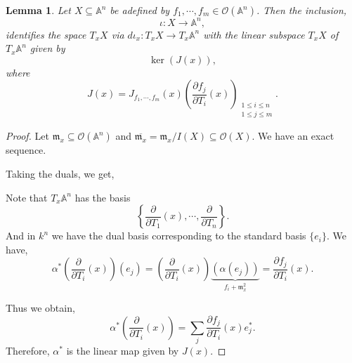 \documentclass[10pt]{article}
\newtheorem{lemma}{Lemma}[section]
\numberwithin{equation}{theorem}
\DeclareMathOperator{\Ker}{ker}
\newcommand{\m}[0]{\mathfrak{m}}
\newcommand{\Ouv}[0]{\mathcal{O}}
\newcommand{\A}[0]{\mathbb{A}}
\begin{document}
\begin{lemma}
  \label{lemma_5_6}
  Let $X\subseteq \A^n$ be adefined by $f_1,\cdots,f_m\in\Ouv(\A^n)$. Then the inclusion, 
  \begin{equation*}
    \iota:X\to \A^n,
  \end{equation*}
  identifies the space $T_xX$ via $d\iota_x:T_xX\to T_x\A^n$ with the linear subspace $T_xX$ of $T_x\A^n$ given by 
  \begin{equation*}
    \Ker(J(x)),
  \end{equation*}
  where 
  \begin{equation*}
    J(x) = J_{f_1,\cdots,f_m}(x)\left({\frac {\partial f_j}{\partial T_i}}(x)\right)_{\substack{1\leq i\leq n\\ 1\leq j\leq m}}.
  \end{equation*}
\end{lemma}
\begin{proof}
Let $\m_x\subseteq\Ouv(\A^n)$ and $\overline{\m_x} = \m_x/I(X)\subseteq\Ouv(X)$. We have an exact sequence.
\begin{center}
\end{center} 
Taking the duals, we get,
\begin{center}
\end{center}
Note that $T_x\A^n$ has the basis 
\begin{equation*}
  \left\{{\frac {\partial }{\partial T_1}}(x),\cdots,\frac {\partial }{\partial T_n}\right\}.
\end{equation*}
And in $k^n$ we have the dual basis corresponding to the standard basis $\{e_i\}$.
We have,
\begin{equation*}
  \alpha^*\left({\frac {\partial}{\partial T_i}}(x)\right)(e_j) = \left({\frac{\partial}{\partial T_i}}(x)\right)\underbrace{(\alpha(e_j))}_{f_i+\m_x^2} = {\frac {\partial f_j} {\partial T_i}}(x).
\end{equation*}

Thus we obtain,
\begin{equation*}
  \alpha^*\left({\frac {\partial }{\partial T_i}}(x)\right) = \sum_j {\frac {\partial f_j} {\partial T_i}}(x)e_j^*.
\end{equation*}
Therefore, $\alpha^*$ is the linear map given by $J(x)$.
\end{proof}
\end{document}
